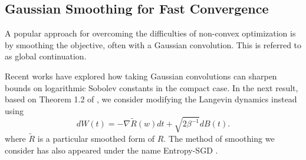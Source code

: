 \documentclass{article}
\begin{document}


\subsection{Gaussian Smoothing for Fast Convergence}
A popular approach for overcoming the difficulties of non-convex optimization is by smoothing the objective, often with a Gaussian convolution. This is referred to as global continuation.

Recent works \cite{Bardet2015FunctionalDependence, Zimmermann2013LogarithmicMeasures} have explored how taking Gaussian convolutions can sharpen bounds on logarithmic Sobolev constants in the compact case. In the next result, based on Theorem 1.2 of \cite{Bardet2015FunctionalDependence}, we consider modifying the Langevin dynamics instead using
\begin{equation}\label{eq:smooth_sde}
    dW(t) = - \nabla \tilde{R}(w) dt + \sqrt{2\beta^{-1}} dB(t).
\end{equation}
where \(\tilde{R}\) is a particular smoothed form of \(R\). The method of smoothing we consider has also appeared under the name Entropy-SGD \cite{Chaudhari2017Entropy-SGD:Valleys}.
\end{document}
